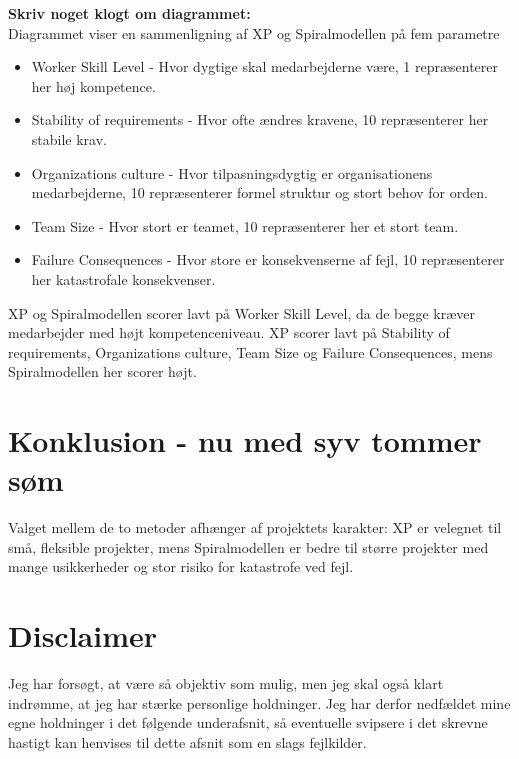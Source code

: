 \textbf{Skriv noget klogt om diagrammet:}\\
Diagrammet viser en sammenligning af XP og Spiralmodellen på fem parametre
\begin{itemize}
    \item Worker Skill Level - Hvor dygtige skal medarbejderne være, 1 repræsenterer her høj kompetence.
    \item Stability of requirements - Hvor ofte ændres kravene, 10 repræsenterer her stabile krav.
    \item Organizations culture - Hvor tilpasningsdygtig er organisationens medarbejderne, 10 repræsenterer formel struktur og stort behov for orden.
    \item Team Size - Hvor stort er teamet, 10 repræsenterer her et stort team.
    \item Failure Consequences - Hvor store er konsekvenserne af fejl, 10 repræsenterer her katastrofale konsekvenser.
\end{itemize}
XP og Spiralmodellen scorer lavt på Worker Skill Level, da de begge kræver medarbejder med højt kompetenceniveau. 
XP scorer lavt på Stability of requirements, Organizations culture, Team Size og Failure Consequences, mens Spiralmodellen her scorer højt.

\section{Konklusion - nu med syv tommer søm}
Valget mellem de to metoder afhænger af projektets karakter: XP er velegnet til små, fleksible projekter, mens Spiralmodellen er bedre til større projekter med mange usikkerheder og stor risiko for katastrofe ved fejl.

\section{Disclaimer}
Jeg har forsøgt, at være så objektiv som mulig, men jeg skal også klart indrømme, at jeg har stærke personlige holdninger.
Jeg har derfor nedfældet mine egne holdninger i det følgende underafsnit, så eventuelle svipsere i det skrevne hastigt kan henvises til dette afsnit som en slags fejlkilder.

